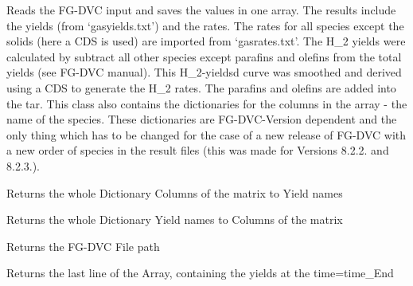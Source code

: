 \documentclass[letterpaper,10pt,english]{sphinxmanual}
\begin{document}
\begin{fulllineitems}
\label{FGDVCClasses:Fit_one_run.FGDVC_Result}
Reads the FG-DVC input and saves the values in one array. The results include the yields (from `gasyields.txt') and the rates. The rates for all species except the solids (here a CDS is used) are imported from `gasrates.txt'. The H\_2 yields were calculated by subtract all other species except parafins and olefins from the total yields (see FG-DVC manual). This H\_2-yieldsd curve was smoothed and derived using a CDS to generate the H\_2 rates. The parafins and olefins are added into the tar. This class also contains the dictionaries for the columns in the array - the name of the species. These dictionaries are FG-DVC-Version dependent and the only thing which has to be changed for the case of a new release of FG-DVC with a new order of species in the result files (this was made for Versions 8.2.2. and 8.2.3.).

\begin{fulllineitems}
\label{FGDVCClasses:Fit_one_run.FGDVC_Result.DictCols2Yields}
Returns the whole Dictionary Columns of the matrix to Yield names

\end{fulllineitems}


\begin{fulllineitems}
\label{FGDVCClasses:Fit_one_run.FGDVC_Result.DictYields2Cols}
Returns the whole Dictionary Yield names to Columns of the matrix

\end{fulllineitems}


\begin{fulllineitems}
\label{FGDVCClasses:Fit_one_run.FGDVC_Result.FilePath}
Returns the FG-DVC File path

\end{fulllineitems}


\begin{fulllineitems}
\label{FGDVCClasses:Fit_one_run.FGDVC_Result.FinalYields}
Returns the last line of the Array, containing the yields at the time=time\_End


\end{fulllineitems}
\end{fulllineitems}
\end{document}
